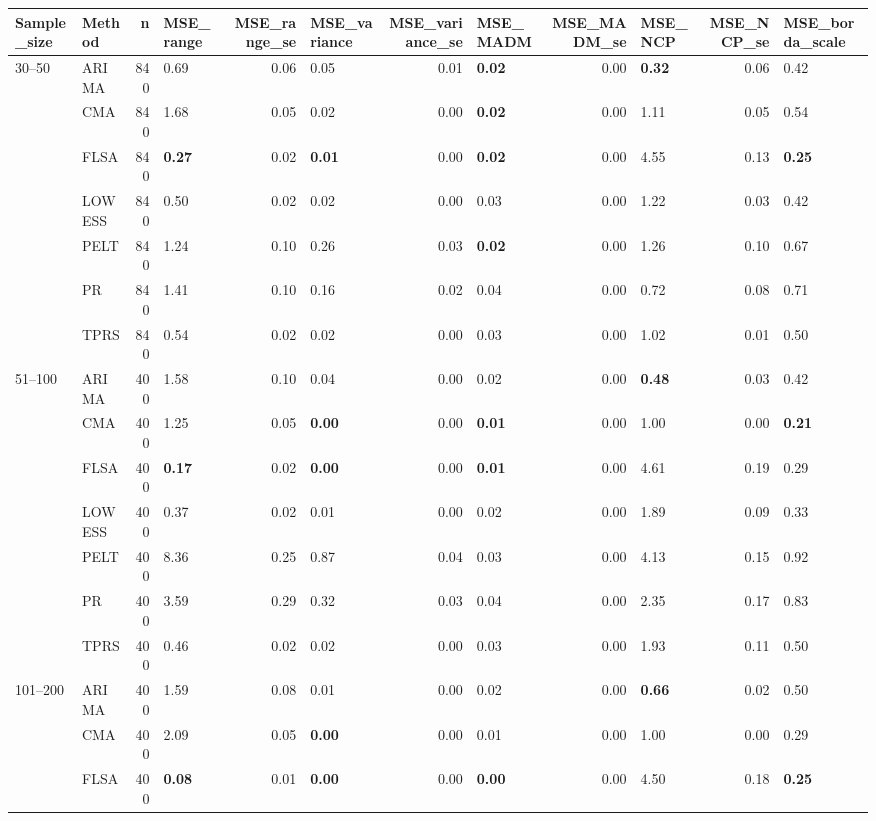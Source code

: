 \begin{table}[ht]
\centering
\begin{tabular}{llrlrlrlrlrl}
  \toprule
Sample_size & Method & n & MSE_range & MSE_range_se & MSE_variance & MSE_variance_se & MSE_MADM & MSE_MADM_se & MSE_NCP & MSE_NCP_se & MSE_borda_scale \\ 
  \midrule
30–50 & ARIMA & 840 & 0.69 & 0.06 & 0.05 & 0.01 & \textbf{0.02} & 0.00 & \textbf{0.32} & 0.06 & 0.42 \\ 
   & CMA & 840 & 1.68 & 0.05 & 0.02 & 0.00 & \textbf{0.02} & 0.00 & 1.11 & 0.05 & 0.54 \\ 
   & FLSA & 840 & \textbf{0.27} & 0.02 & \textbf{0.01} & 0.00 & \textbf{0.02} & 0.00 & 4.55 & 0.13 & \textbf{0.25} \\ 
   & LOWESS & 840 & 0.50 & 0.02 & 0.02 & 0.00 & 0.03 & 0.00 & 1.22 & 0.03 & 0.42 \\ 
   & PELT & 840 & 1.24 & 0.10 & 0.26 & 0.03 & \textbf{0.02} & 0.00 & 1.26 & 0.10 & 0.67 \\ 
   & PR & 840 & 1.41 & 0.10 & 0.16 & 0.02 & 0.04 & 0.00 & 0.72 & 0.08 & 0.71 \\ 
   & TPRS & 840 & 0.54 & 0.02 & 0.02 & 0.00 & 0.03 & 0.00 & 1.02 & 0.01 & 0.50 \\ 
  51–100 & ARIMA & 400 & 1.58 & 0.10 & 0.04 & 0.00 & 0.02 & 0.00 & \textbf{0.48} & 0.03 & 0.42 \\ 
   & CMA & 400 & 1.25 & 0.05 & \textbf{0.00} & 0.00 & \textbf{0.01} & 0.00 & 1.00 & 0.00 & \textbf{0.21} \\ 
   & FLSA & 400 & \textbf{0.17} & 0.02 & \textbf{0.00} & 0.00 & \textbf{0.01} & 0.00 & 4.61 & 0.19 & 0.29 \\ 
   & LOWESS & 400 & 0.37 & 0.02 & 0.01 & 0.00 & 0.02 & 0.00 & 1.89 & 0.09 & 0.33 \\ 
   & PELT & 400 & 8.36 & 0.25 & 0.87 & 0.04 & 0.03 & 0.00 & 4.13 & 0.15 & 0.92 \\ 
   & PR & 400 & 3.59 & 0.29 & 0.32 & 0.03 & 0.04 & 0.00 & 2.35 & 0.17 & 0.83 \\ 
   & TPRS & 400 & 0.46 & 0.02 & 0.02 & 0.00 & 0.03 & 0.00 & 1.93 & 0.11 & 0.50 \\ 
  101–200 & ARIMA & 400 & 1.59 & 0.08 & 0.01 & 0.00 & 0.02 & 0.00 & \textbf{0.66} & 0.02 & 0.50 \\ 
   & CMA & 400 & 2.09 & 0.05 & \textbf{0.00} & 0.00 & 0.01 & 0.00 & 1.00 & 0.00 & 0.29 \\ 
   & FLSA & 400 & \textbf{0.08} & 0.01 & \textbf{0.00} & 0.00 & \textbf{0.00} & 0.00 & 4.50 & 0.18 & \textbf{0.25} \\ 

\end{tabular}
\end{table}
